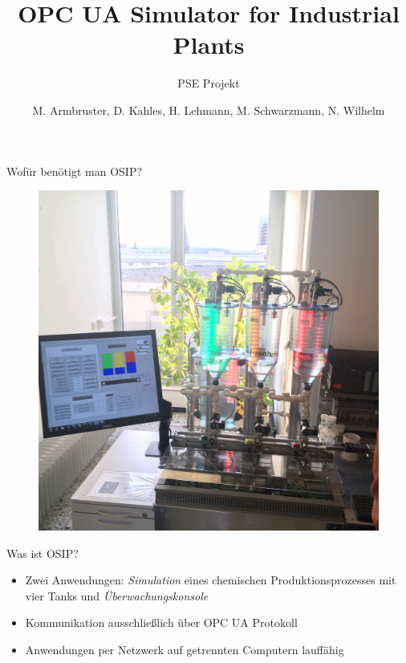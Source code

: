 \documentclass[22pt]{beamer}
\title[OSIP]{OPC UA Simulator for Industrial Plants}
\subtitle{PSE Projekt}
\author{M. Armbruster, D. Kahles, H. Lehmann, M. Schwarzmann, N. Wilhelm}
\begin{document}

\begin{frame}
\titlepage
\end{frame}

\begin{frame}{Wofür benötigt man OSIP?}
\begin{figure}[ht!]
\centering
\includegraphics[height=\textheight,width=\textwidth,keepaspectratio=true]{Demoanlage_IOSB.jpg}
\end{figure}
\end{frame}

\begin{frame}{Was ist OSIP?}
\begin{itemize}[<+->]
 \item Zwei Anwendungen: \emph{Simulation} eines chemischen Produktionsprozesses mit vier Tanks und \emph{Überwachungskonsole}
 \item Kommunikation ausschließlich über OPC UA Protokoll
 \item Anwendungen per Netzwerk auf getrennten Computern lauffähig
\end{itemize}
\end{frame}
\end{document}
